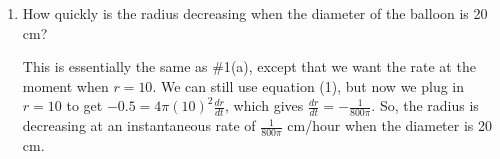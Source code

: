 \documentclass{article}
\begin{document}
\begin{enumerate}
\begin{enumerate}
\begin{solution}
        \textbf{Rate we know:} $\diff{V}{t} = -0.5 \text{ cm}^3/\text{hr}$ 

        \textbf{Rate we want to know:} $\diff{r}{t}[r=15\text{ cm}]$

      \textbf{Equation relating our variables:} $V =
        \frac{4}{3} \pi r^3$

      Once we have our relating equation, we differentiate it.
        Since we are looking for $\frac{dr}{dt}$, we should
        differentiate with respect to $t$.
      \begin{align}
        \frac{d}{dt} V &= \frac{d}{dt} \!\left( \frac{4}{3} \pi r^3
        \right) \nonumber \\
        \frac{dV}{dt} &= 4 \pi r^2
        \frac{dr}{dt}
\\
        \shortintertext{Plugging in what we know,}
        -0.5 &= 4 \pi (15)^2 \frac{dr}{dt}, \nonumber 
      \end{align}
      so $\frac{dr}{dt} = \frac{-0.5}{4 \pi (15)^2} = - \frac{1}{1800
        \pi}$ cm/hour.  That is, the radius is decreasing at an
        instantaneous rate of $\frac{1}{1800 \pi}$ cm/hour when the diameter of the balloon is 30 cm.
    \end{solution}

  \item
    \begin{problem}[\stretch{1}]
      How quickly is the radius decreasing when the diameter of the
      balloon is 20 cm?
    \end{problem}

    \begin{solution}
      This is essentially the same as {{{{\#1}}(a)}},
      except that we want the rate at the moment when $r = 10$.  We can
      still use equation (1), but now we plug in $r
      = 10$ to get $-0.5 = 4 \pi (10)^2 \frac{dr}{dt}$, which gives
      $\frac{dr}{dt} = - \frac{1}{800 \pi}$.  So, the radius is
      decreasing at an instantaneous rate of $\frac{1}{800 \pi}$
        cm/hour when the diameter is 20 cm.
    \end{solution}




\end{enumerate}
\end{enumerate}
\end{document}
